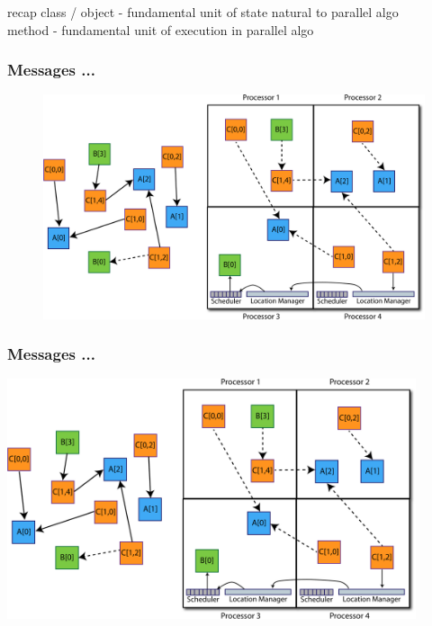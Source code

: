 \begin{frame}
recap
    class / object - fundamental unit of state natural to parallel algo\\
    method - fundamental unit of execution in parallel algo\\
\end{frame}


\begin{frame}
  \frametitle{Messages ...
  }
  \begin{figure}
  \includegraphics[trim=0in 0in 14in 2in, clip=true, height=0.85\textheight]{../figures/elements2.pdf}
  \end{figure}
\end{frame}


\begin{frame}
  \frametitle{Messages ...
  }
  \begin{center}\includegraphics[width=0.9\textwidth]{../figures/elements2.pdf}\end{center}
\end{frame}



